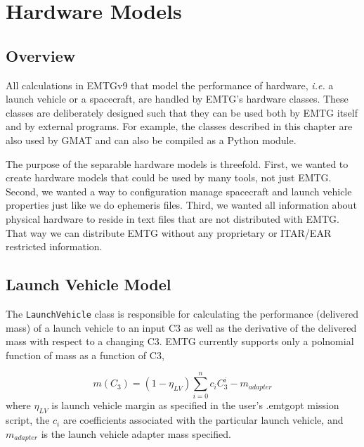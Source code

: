 


\chapter{Hardware Models}
\label{chap:hardware_models}

\section{Overview}
\label{sec:hardware-overview}

All calculations in EMTGv9 that model the performance of hardware, \textit{i.e.} a launch vehicle or a spacecraft, are handled by \ac{EMTG}'s hardware classes. These classes are deliberately designed such that they can be used both by EMTG itself and by external programs. For example, the classes described in this chapter are also used by \ac{GMAT} and can also be compiled as a Python module.

The purpose of the separable hardware models is threefold. First, we wanted to create hardware models that could be used by many tools, not just EMTG. Second, we wanted a way to configuration manage spacecraft and launch vehicle properties just like we do ephemeris files. Third, we wanted all information about physical hardware to reside in text files that are not distributed with \ac{EMTG}. That way we can distribute \ac{EMTG} without any proprietary or ITAR/EAR restricted information.

\section{Launch Vehicle Model}
\label{sec:LaunchVehicle}

The \texttt{LaunchVehicle} class is responsible for calculating the performance (delivered mass) of a launch vehicle to an input \ac{C3} as well as the derivative of the delivered mass with respect to a changing \ac{C3}. \ac{EMTG} currently supports only a polnomial function of mass as a function of \ac{C3},

\begin{equation}
	m \left(C_3\right) = \left(1 - \eta_{LV}\right) \sum_{i=0}^{n} c_i C_3^i - m_{adapter}
	\label{eq:launch_vehicle_polynomial}
\end{equation}
%
where $\eta_{LV}$ is launch vehicle margin as specified in the user's .emtgopt mission script, the $c_i$ are coefficients associated with the particular launch vehicle, and $m_{adapter}$ is the launch vehicle adapter mass specified.

